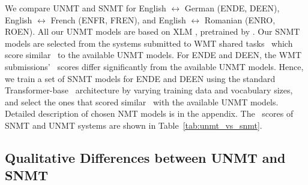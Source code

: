We compare UNMT and SNMT for English $\leftrightarrow$ German (ENDE, DEEN), English $\leftrightarrow$ French (ENFR, FREN), and English $\leftrightarrow$ Romanian (ENRO, ROEN).
All our UNMT models are based on XLM \citep{conneau-NIPS2019-xlm}, pretrained by \citet{XLM-UNMT-Models20}. 
Our SNMT models are selected from the systems submitted to WMT shared tasks~\cite{bojar-EtAl:2014:W14-33,bojar-EtAl:2016:WMT1} which score similar \bleu\ to the available UNMT models.
For ENDE and DEEN, the WMT submissions' \bleu\ scores differ significantly from the available UNMT models.
Hence, we train a set of SNMT models for ENDE and DEEN using the standard Transformer-base~\cite{vaswani2017attention} architecture by varying training data and vocabulary sizes, and select the ones that scored similar \bleu\ with the available UNMT models. %
Detailed description of chosen NMT models is in the appendix.
The \bleu\ scores of SNMT and UNMT systems are shown in Table~\ref{tab:unmt_vs_snmt}.

\subsection{Qualitative Differences between UNMT and SNMT}

